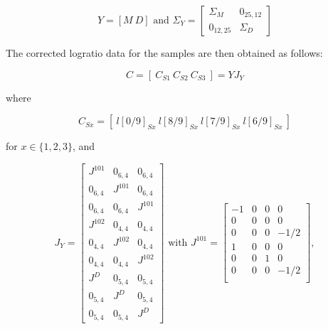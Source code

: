 \documentclass{article}
\begin{document}
\begin{equation}
  Y = [ M ~ D ] \mbox{~and~}
  \Sigma_Y = \left[
    \begin{array}{cc}
      \Sigma_M & 0_{25,12} \\
      0_{12,25} & \Sigma_D
    \end{array}
    \right]
\end{equation}

The corrected logratio data for the samples are then obtained as
follows:

\begin{equation}
  C = \left[~C_{S1}~C_{S2}~C_{S3}~\right] = Y J_Y
\end{equation}

\noindent where

\begin{equation}
  C_{Sx} = \left[~l[0/9]_{Sx}~l[8/9]_{Sx}~l[7/9]_{Sx}~l[6/9]_{Sx}~\right]
\end{equation}

\noindent for $x \in \{1, 2, 3\}$, and

\begin{equation}
  J_Y = \left[
    \begin{array}{ccc}
      J^{101} & 0_{6,4} & 0_{6,4} \\
      0_{6,4} & J^{101} & 0_{6,4} \\
      0_{6,4} & 0_{6,4} & J^{101} \\
      J^{102} & 0_{4,4} & 0_{4,4} \\
      0_{4,4} & J^{102} & 0_{4,4} \\
      0_{4,4} & 0_{4,4} & J^{102} \\
      J^D    & 0_{5,4} & 0_{5,4} \\
      0_{5,4} & J^D    & 0_{5,4} \\
      0_{5,4}  & 0_{5,4} & J^D 
    \end{array}
    \right]
  \mbox{~with~}
  J^{101} = \left[
    \begin{array}{cccc}
      -1 & 0 & 0 & 0   \\
      0 & 0 & 0 & 0    \\
      0 & 0 & 0 & -1/2 \\
      1 & 0 & 0 & 0    \\
      0 & 0 & 1 & 0    \\
      0 & 0 & 0 & -1/2 \\
    \end{array}
    \right],
\end{equation}
\end{document}
